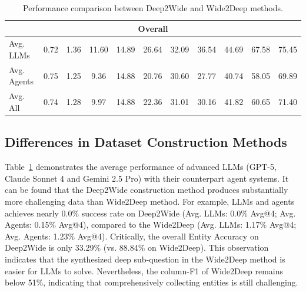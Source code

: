 \documentclass[11pt, letterpaper, logo, onecolumn, copyright, numbering]{paper_improved}
\begin{document}
\begin{table}[t]
{\begin{tabular}{l|cc cc cc|cc cc}
\midrule
\multicolumn{11}{c}{Overall} \\
\midrule
Avg. LLMs & 0.72 & 1.36 & 11.60 & 14.89 & 26.64 & 32.09 & 36.54 & 44.69 & 67.58 & 75.45 \\
Avg. Agents & 0.75 & 1.25 & 9.36 & 14.88 & 20.76 & 30.60 & 27.77 & 40.74 & 58.05 & 69.89 \\
Avg. All & 0.74 & 1.28 & 9.97 & 14.88 & 22.36 & 31.01 & 30.16 & 41.82 & 60.65 & 71.40 \\
\bottomrule
\end{tabular}
}
\caption{Performance comparison between Deep2Wide and Wide2Deep methods.\label{tab:diffiulty_of_data_splits}}
\end{table}


\subsection{Differences in Dataset Construction Methods\label{subsec.difference_in_dataset_method}}
Table~\ref{tab:diffiulty_of_data_splits} demonstrates the  average performance of advanced LLMs (GPT-5, Claude Sonnet 4 and Gemini 2.5 Pro) with their counterpart agent systems.
It can be found that the Deep2Wide construction method produces substantially more challenging data than Wide2Deep method. For example, LLMs and agents achieves nearly 0.0\% success rate on Deep2Wide (Avg. LLMs: 0.0\% Avg@4; Avg. Agents: 0.15\% Avg@4), compared to the Wide2Deep (Avg. LLMs: 1.17\% Avg@4; Avg. Agents: 1.23\% Avg@4). Critically, the overall Entity Accuracy on Deep2Wide is only 33.29\% (vs. 88.84\% on Wide2Deep). This observation indicates that the synthesized deep sub-question in the Wide2Deep method is easier for LLMs to solve.
Nevertheless, the column-F1 of Wide2Deep remains below 51\%, indicating that comprehensively collecting entities is still challenging.
\end{document}
